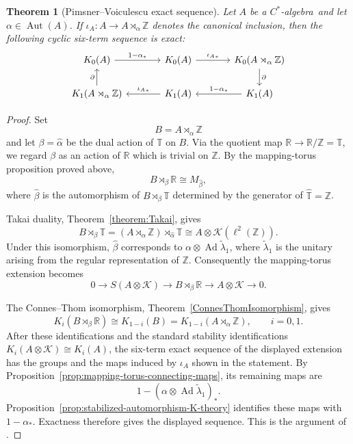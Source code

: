 \documentclass{book}
\newtheorem{theorem}[definition]{Theorem}
\def\cstar{\(C^*\)-algebra}
\begin{document}
\begin{theorem}[Pimsner--Voiculescu exact sequence]
  Let \(A\) be a \cstar\ and let \(\alpha\in\operatorname{Aut}(A)\). If
  \(\iota_A:A\to A\rtimes_\alpha\mathbb Z\) denotes the canonical inclusion,
  then the following cyclic six-term sequence is exact:
  \[
    \begin{tikzcd}[column sep=large]
      K_0(A)\arrow[r,"1-\alpha_*"]
      &K_0(A)\arrow[r,"{\iota_A}_*"]
      &K_0(A\rtimes_\alpha\mathbb Z)\arrow[d,"\partial"]\\
      K_1(A\rtimes_\alpha\mathbb Z)\arrow[u,"\partial"]
      &K_1(A)\arrow[l,"{\iota_A}_*"']
      &K_1(A)\arrow[l,"1-\alpha_*"']
    \end{tikzcd}
  \]
\end{theorem}
\begin{proof}
  Set
  \[
    B=A\rtimes_\alpha\mathbb Z
  \]
  and let \(\beta=\widehat\alpha\) be the dual action of \(\mathbb T\) on
  \(B\). Via the quotient map \(\mathbb R\to\mathbb R/\mathbb Z=\mathbb T\),
  we regard \(\beta\) as an action of \(\mathbb R\) which is trivial on
  \(\mathbb Z\). By the mapping-torus proposition proved above,
  \[
    B\rtimes_\beta\mathbb R
    \cong
    M_{\widehat\beta},
  \]
  where \(\widehat\beta\) is the automorphism of
  \(B\rtimes_\beta\mathbb T\) determined by the generator of
  \(\hat{\mathbb T}=\mathbb Z\).

  Takai duality, Theorem~\ref{theorem:Takai}, gives
  \[
    B\rtimes_\beta\mathbb T
    =
    (A\rtimes_\alpha\mathbb Z)
    \rtimes_{\widehat\alpha}\mathbb T
    \cong
    A\otimes\mathcal K(\ell^2(\mathbb Z)).
  \]
  Under this isomorphism, \(\widehat\beta\) corresponds to
  \(\alpha\otimes\operatorname{Ad}\widetilde\lambda_1\), where
  \(\widetilde\lambda_1\) is the unitary arising from the regular
  representation of \(\mathbb Z\). Consequently the mapping-torus extension
  becomes
  \[
    0\longrightarrow S(A\otimes\mathcal K)
    \longrightarrow B\rtimes_\beta\mathbb R
    \longrightarrow A\otimes\mathcal K
    \longrightarrow0.
  \]

  The Connes--Thom isomorphism, Theorem~\ref{ConnesThomIsomorphism}, gives
  \[
    K_i(B\rtimes_\beta\mathbb R)
    \cong
    K_{1-i}(B)
    =
    K_{1-i}(A\rtimes_\alpha\mathbb Z),
    \qquad i=0,1.
  \]
  After these identifications and the standard stability identifications
  \(K_i(A\otimes\mathcal K)\cong K_i(A)\), the six-term exact sequence of the
  displayed extension has the groups and the maps induced by \(\iota_A\) shown
  in the statement. By Proposition~\ref{prop:mapping-torus-connecting-maps},
  its remaining maps are
  \[
    1-(\alpha\otimes\operatorname{Ad}\widetilde\lambda_1)_*.
  \]
  Proposition~\ref{prop:stabilized-automorphism-K-theory} identifies these
  maps with \(1-\alpha_*\). Exactness therefore gives the displayed sequence.
  This is the argument of \cite[Section~10.4]{Blackadar1998}.
\end{proof}
\end{document}
